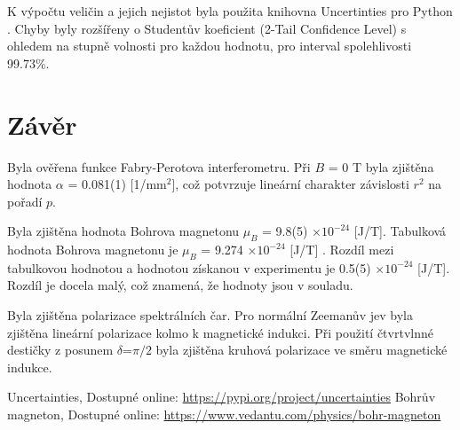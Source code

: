 \documentclass[a4paper,11pt]{article}
\begin{document}
\newpage
                \par K výpočtu veličin a jejich nejistot byla použita knihovna Uncertinties pro Python \cite{uncertainties}. Chyby byly rozšířeny o Studentův koeficient (2-Tail Confidence Level) s ohledem na stupně volnosti pro každou hodnotu, pro interval spolehlivosti 99.73\%.

        \section{Závěr}
                Byla ověřena funkce Fabry-Perotova interferometru. Při $B$ = 0 T byla zjištěna hodnota $\alpha$ = 0.081(1) [1/mm$^2$], což potvrzuje lineární charakter závislosti $r^2$ na pořadí $p$. 
                \par Byla zjištěna hodnota Bohrova magnetonu $\mu_B$ = 9.8(5) $\times 10^{-24}$ [J/T]. Tabulková hodnota Bohrova magnetonu je $\mu_B$ = 9.274 $\times 10^{-24}$ [J/T] \cite{magneton}. Rozdíl mezi tabulkovou hodnotou a hodnotou získanou v experimentu je 0.5(5) $\times 10^{-24}$ [J/T]. Rozdíl je docela malý, což znamená, že hodnoty jsou v souladu.
                \par Byla zjištěna polarizace spektrálních čar. Pro normální Zeemanův jev byla zjištěna lineární polarizace kolmo k magnetické indukci. Při použití čtvrtvlnné destičky z posunem $\delta$=$\pi/2$ byla zjištěna kruhová polarizace ve směru magnetické indukce. 

                \renewcommand{\refname}{Odkazy}
                \begin{thebibliography}{9}
                        Uncertainties, Dostupné online: \url{https://pypi.org/project/uncertainties}
                        Bohrův magneton, Dostupné online: \url{https://www.vedantu.com/physics/bohr-magneton}
                \end{thebibliography} 
\end{document}
